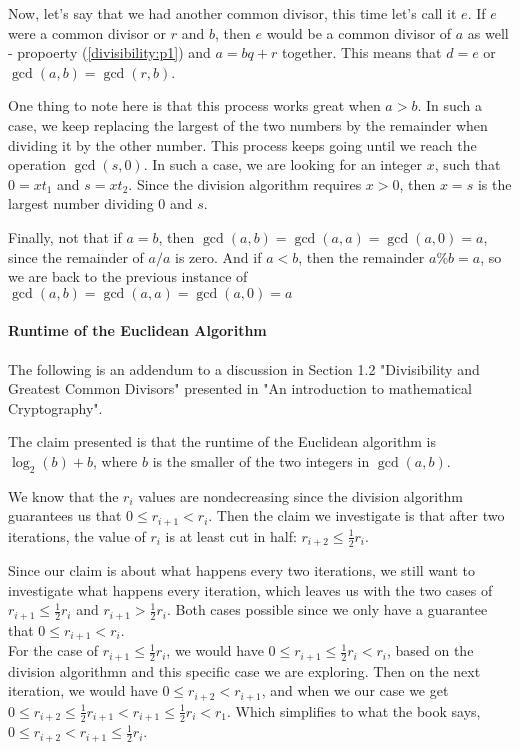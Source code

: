 Now, let's say that we had another common divisor, this time let's call it $e$.
If $e$ were a common divisor or $r$ and $b$, then $e$ would be a common divisor of $a$ as well
- propoerty (\ref{divisibility:p1}) and $a = bq + r$ together.
This means that $d = e$ or $\gcd(a,b) = \gcd(r,b)$.

One thing to note here is that this process works great when $a > b$.
In such a case, we keep replacing the largest of the two numbers by the remainder when dividing it by the other number.
This process keeps going until we reach the operation $\gcd(s,0)$.
In such a case, we are looking for an integer $x$, such that $0 = xt_1$ and $s = xt_2$.
Since the division algorithm requires $x>0$, then $x=s$ is the largest number dividing $0$ and $s$.

Finally, not that if $a=b$, then $\gcd(a,b) = \gcd(a,a) = \gcd(a,0) = a$, since the remainder of $a/a$ is zero.
And if $a < b$, then the remainder $a\%b = a$, so we are back to the previous instance of $\gcd(a,b) = \gcd(a,a) = \gcd(a,0) = a$


\paragraph{Runtime of the Euclidean Algorithm}

The following is an addendum to a discussion in Section 1.2 "Divisibility and Greatest Common Divisors"
presented in "An introduction to mathematical Cryptography".

The claim presented is that the runtime of the Euclidean algorithm is $\log_2 (b) + b$, where $b$ is the smaller of the
two integers in $\gcd(a,b)$.

We know that the $r_i$ values are nondecreasing since the division algorithm guarantees us that
$0 \leq r_{i+1} < r_i$.
Then the claim we investigate is that after two iterations, the value of $r_i$ is at least cut in half:
$r_{i+2} \leq \frac{1}{2}r_i$.

Since our claim is about what happens every two iterations, we still want to investigate what happens every iteration,
which leaves us with the two cases of $r_{i+1} \leq \frac{1}{2}r_i$ and $r_{i+1} > \frac{1}{2}r_i$.
Both cases possible since we only have a guarantee that $0 \leq r_{i+1} < r_i$.
\\

For the case of $r_{i+1} \leq \frac{1}{2}r_i$, we would have $0 \leq r_{i+1} \leq \frac{1}{2}r_i < r_i$, based on the
division algorithmn and this specific case we are exploring.
Then on the next iteration, we would have $0 \leq r_{i+2} < r_{i+1}$, and when we our case we get
$0 \leq r_{i+2} \leq \frac{1}{2}r_{i+1} < r_{i+1} \leq \frac{1}{2}r_i < r_1$.
Which simplifies to what the book says, $0 \leq r_{i+2} < r_{i+1} \leq \frac{1}{2}r_i$.
\\

